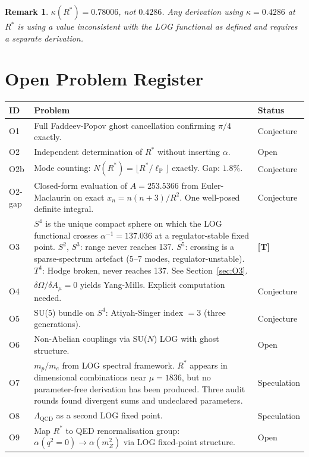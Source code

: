 \documentclass[12pt,a4paper]{article}
\newcommand{\lP}{\ell_{\mathrm{P}}}
\newcommand{\Om}{\Omega}
\newcommand{\kap}{\kappa}
\newtheorem{remark}{Remark}[section]
\begin{document}
\begin{remark}
$\kap(R^*) = 0.78006$, not $0.4286$.
Any derivation using $\kap = 0.4286$ at $R^*$
is using a value inconsistent with the LOG functional
as defined and requires a separate derivation.
\end{remark}

\section{Open Problem Register}
\label{sec:problems}

\begin{center}
\renewcommand{\arraystretch}{1.4}
\begin{tabular}{lp{8.0cm}l}
\toprule
\textbf{ID} & \textbf{Problem} & \textbf{Status} \\
\midrule
O1 & Full Faddeev-Popov ghost cancellation
  confirming $\pi/4$ exactly. & Conjecture \\
O2 & Independent determination of $R^*$
  without inserting $\alpha$. & Open \\
O2b & Mode counting: $N(R^*) = \lfloor R^*/\lP\rfloor$
  exactly. Gap: $1.8\%$. & Conjecture \\
O2-gap & Closed-form evaluation of $A = 253.5366$
  from Euler-Maclaurin on exact $x_n = n(n+3)/R^2$.
  One well-posed definite integral. & Conjecture \\
O3 & $S^4$ is the unique compact sphere
  on which the LOG functional crosses
  $\alpha^{-1} = 137.036$ at a
  regulator-stable fixed point.
  $S^2$, $S^3$: range never reaches 137.
  $S^5$: crossing is a sparse-spectrum
  artefact (5--7 modes, regulator-unstable).
  $T^4$: Hodge broken, never reaches 137.
  See Section~\ref{sec:O3}. & \textbf{[T]} \\
O4 & $\delta\Om/\delta A_\mu = 0$ yields Yang-Mills.
  Explicit computation needed. & Conjecture \\
O5 & SU(5) bundle on $S^4$: Atiyah-Singer
  index $= 3$ (three generations). & Conjecture \\
O6 & Non-Abelian couplings via SU($N$) LOG
  with ghost structure. & Open \\
O7 & $m_p/m_e$ from LOG spectral framework.
  $R^*$ appears in dimensional combinations
  near $\mu = 1836$, but no parameter-free
  derivation has been produced.
  Three audit rounds found divergent sums
  and undeclared parameters. & Speculation \\
O8 & $\Lambda_{\mathrm{QCD}}$ as a second
  LOG fixed point. & Speculation \\
O9 & Map $R^*$ to QED renormalisation group:
  $\alpha(q^2 = 0) \to \alpha(m_Z^2)$
  via LOG fixed-point structure. & Open \\
\bottomrule
\end{tabular}
\end{center}
\end{document}
